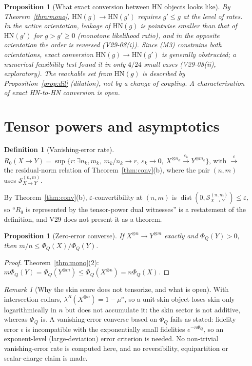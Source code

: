 \documentclass[11pt]{article}
\newtheorem{proposition}[theorem]{Proposition}
\theoremstyle{definition}
\newtheorem{definition}{Definition}
\theoremstyle{remark}
\newtheorem{remark}{Remark}
\DeclareMathOperator{\dist}{dist}
\begin{document}
\begin{proposition}[What exact conversion between HN objects looks like]
By Theorem~\ref{thm:mono}, $\mathrm{HN}(g)\to\mathrm{HN}(g')$ requires $g'\le g$ at the level of rates. In the active orientation, leakage of $\mathrm{HN}(g)$ is pointwise smaller than that of $\mathrm{HN}(g')$ for $g>g'\ge0$ (monotone likelihood ratio), and in the opposite orientation the order is reversed (V29-08(i)). Since (M3) constrains both orientations, exact conversion $\mathrm{HN}(g)\to\mathrm{HN}(g')$ is generally obstructed; a numerical feasibility test found it in only $4/24$ small cases (V29-08(ii), exploratory). The reachable set from $\mathrm{HN}(g)$ is described by Proposition~\ref{prop:dil} (dilution), not by a change of coupling. A characterisation of exact HN-to-HN conversion is open.
\end{proposition}

\section{Tensor powers and asymptotics}
\label{sec:asym}

\begin{definition}[Vanishing-error rate]
$R_0(X\to Y)=\sup\{r:\exists n_k,m_k,\ m_k/n_k\to r,\ \varepsilon_k\to0,\ X^{\otimes n_k}\xrightarrow{\varepsilon_k}Y^{\otimes m_k}\}$, with $\xrightarrow{\varepsilon}$ the residual-norm relation of Theorem~\ref{thm:conv}(b), where the pair $(n,m)$ uses $\mathcal S^{(n,m)}_{X\to Y}$.
\end{definition}
By Theorem~\ref{thm:conv}(b), $\varepsilon$-convertibility at $(n,m)$ is $\dist(0,\mathcal S^{(n,m)}_{X\to Y})\le\varepsilon$, so ``$R_0$ is represented by the tensor-power dual witnesses'' is a restatement of the definition, and V29 does not present it as a theorem.

\begin{proposition}[Zero-error converse]\label{prop:conv0}
If $X^{\otimes n}\to Y^{\otimes m}$ exactly and $\Phi_Q(Y)>0$, then $m/n\le\Phi_Q(X)/\Phi_Q(Y)$.
\end{proposition}
\begin{proof}
Theorem~\ref{thm:mono}(2): $m\Phi_Q(Y)=\Phi_Q(Y^{\otimes m})\le\Phi_Q(X^{\otimes n})=n\Phi_Q(X)$.
\end{proof}
\begin{remark}[Why the skin score does not tensorize, and what is open]
With intersection collars, $\lambda^R(X^{\otimes n})=1-\mu^n$, so a unit-skin object loses skin only logarithmically in $n$ but does not accumulate it: the skin sector is not additive, whereas $\Phi_Q$ is. A vanishing-error converse based on $\Phi_Q$ fails as stated: fidelity error $\epsilon$ is incompatible with the exponentially small fidelities $e^{-n\Phi_Q}$, so an exponent-level (large-deviation) error criterion is needed. No non-trivial vanishing-error rate is computed here, and no reversibility, equipartition or scalar-charge claim is made.
\end{remark}
\end{document}
